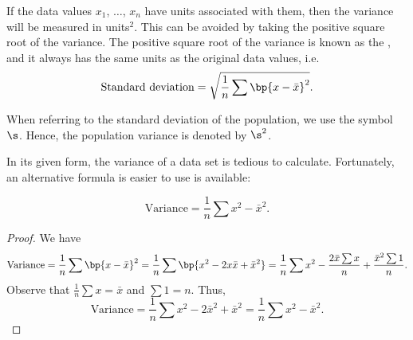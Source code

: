 If the data values $x_1$, $\dots$, $x_n$ have units associated with them, then the variance will be measured in units$^2$. This can be avoided by taking the positive square root of the variance. The positive square root of the variance is known as the , and it always has the same units as the original data values, i.e. \[\text{Standard deviation} = \sqrt{\frac1n \sum \bp{x - \bar x}^2}.\]

When referring to the standard deviation of the population, we use the symbol $\s$. Hence, the population variance is denoted by $\s^2$.

In its given form, the variance of a data set is tedious to calculate. Fortunately, an alternative formula is easier to use is available:

\begin{proposition}
    \[\text{Variance} = \frac1n \sum x^2 - \bar{x}^2.\]
\end{proposition}
\begin{proof}
    We have \[\text{Variance} = \frac1n \sum \bp{x - \bar x}^2 = \frac1n \sum \bp{x^2 - 2x \bar{x} + \bar{x}^2} = \frac1n \sum x^2 - \frac{2\bar{x} \sum x}{n} + \frac{\bar{x}^2 \sum 1}{n}.\] Observe that $\frac1n \sum x = \bar x$ and $\sum 1 = n$. Thus, \[\text{Variance} = \frac1n \sum x^2 - 2\bar{x}^2 + \bar{x}^2 = \frac1n \sum x^2 - \bar{x}^2.\]
\end{proof}